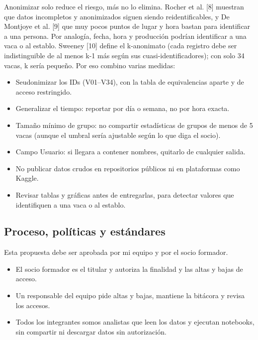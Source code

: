 Anonimizar solo reduce el riesgo, más no lo elimina. Rocher et al. [8] muestran que datos incompletos y anonimizados siguen siendo reidentificables, y De Montjoye et al. [9] que muy pocos puntos de lugar y hora bastan para identificar a una persona. Por analogía, fecha, hora y producción podrían identificar a una vaca o al establo. Sweeney [10] define el k-anonimato (cada registro debe ser indistinguible de al menos k-1 más según sus cuasi-identificadores); con solo 34 vacas, k sería pequeño. Por eso combino varias medidas:

\begin{itemize}
  \item Seudonimizar los IDs (V01–V34), con la tabla de equivalencias aparte y de acceso restringido.
  \item Generalizar el tiempo: reportar por día o semana, no por hora exacta.
  \item Tamaño mínimo de grupo: no compartir estadísticas de grupos de menos de 5 vacas (aunque el umbral sería ajustable según lo que diga el socio).
  \item Campo Usuario: si llegara a contener nombres, quitarlo de cualquier salida.
  \item No publicar datos crudos en repositorios públicos ni en plataformas como Kaggle.
  \item Revisar tablas y gráficas antes de entregarlas, para detectar valores que identifiquen a una vaca o al establo.
\end{itemize}

\subsection{Proceso, políticas y estándares}

Esta propuesta debe ser aprobada por mi equipo y por el socio formador.


\begin{itemize}
  \item El socio formador es el titular y autoriza la finalidad y las altas y bajas de acceso.
  \item Un responsable del equipo pide altas y bajas, mantiene la bitácora y revisa los accesos.
  \item Todos los integrantes somos analistas que leen los datos y ejecutan notebooks, sin compartir ni descargar datos sin autorización.
\end{itemize}

